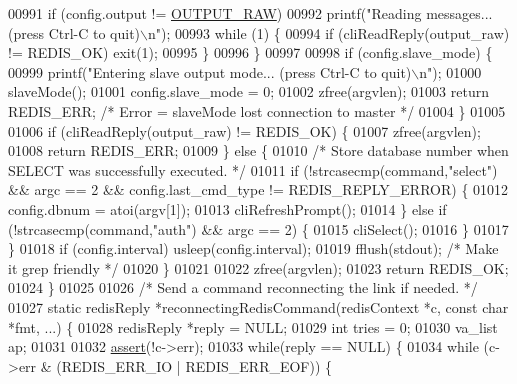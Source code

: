 \begin{DoxyCode}
{{{{{{{{{{{{{{{{{{{{{{{{{{{00991             \textcolor{keywordflow}{if} (config.output != \hyperlink{redis-cli_8c_a4f47017b54da140967dcbd440fae227c}{OUTPUT\_RAW})
00992                 printf(\textcolor{stringliteral}{"Reading messages... (press Ctrl-C to quit)\(\backslash\)n"});
00993             \textcolor{keywordflow}{while} (1) \{
00994                 \textcolor{keywordflow}{if} (cliReadReply(output\_raw) != REDIS\_OK) exit(1);
00995             \}
00996         \}
00997 
00998         \textcolor{keywordflow}{if} (config.slave\_mode) \{
00999             printf(\textcolor{stringliteral}{"Entering slave output mode...  (press Ctrl-C to quit)\(\backslash\)n"});
01000             slaveMode();
01001             config.slave\_mode = 0;
01002             zfree(argvlen);
01003             \textcolor{keywordflow}{return} REDIS\_ERR;  \textcolor{comment}{/* Error = slaveMode lost connection to master */}
01004         \}
01005 
01006         \textcolor{keywordflow}{if} (cliReadReply(output\_raw) != REDIS\_OK) \{
01007             zfree(argvlen);
01008             \textcolor{keywordflow}{return} REDIS\_ERR;
01009         \} \textcolor{keywordflow}{else} \{
01010             \textcolor{comment}{/* Store database number when SELECT was successfully executed. */}
01011             \textcolor{keywordflow}{if} (!strcasecmp(command,\textcolor{stringliteral}{"select"}) && argc == 2 && config.last\_cmd\_type != 
      REDIS\_REPLY\_ERROR) \{
01012                 config.dbnum = atoi(argv[1]);
01013                 cliRefreshPrompt();
01014             \} \textcolor{keywordflow}{else} \textcolor{keywordflow}{if} (!strcasecmp(command,\textcolor{stringliteral}{"auth"}) && argc == 2) \{
01015                 cliSelect();
01016             \}
01017         \}
01018         \textcolor{keywordflow}{if} (config.interval) usleep(config.interval);
01019         fflush(stdout); \textcolor{comment}{/* Make it grep friendly */}
01020     \}
01021 
01022     zfree(argvlen);
01023     \textcolor{keywordflow}{return} REDIS\_OK;
01024 \}
01025 
01026 \textcolor{comment}{/* Send a command reconnecting the link if needed. */}
01027 \textcolor{keyword}{static} redisReply *reconnectingRedisCommand(redisContext *c, \textcolor{keyword}{const} \textcolor{keywordtype}{char} *fmt, ...) \{
01028     redisReply *reply = NULL;
01029     \textcolor{keywordtype}{int} tries = 0;
01030     va\_list ap;
01031 
01032     \hyperlink{redisassert_8h_a993abaa2c168852c1592879472938781}{assert}(!c->err);
01033     \textcolor{keywordflow}{while}(reply == NULL) \{
01034         \textcolor{keywordflow}{while} (c->err & (REDIS\_ERR\_IO | REDIS\_ERR\_EOF)) \{
}}}}}}}}}}}}}}}}}}}}}}}}}}}
\end{DoxyCode}
